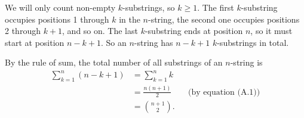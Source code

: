 We will only count non-empty $k$-substrings, so $k\ge1$.
The first $k$-substring occupies positions 1 through $k$ in the $n$-string, the second one occupies positions 2 through $k+1$, and so on.
The last $k$-substring ends at position $n$, so it must start at position $n-k+1$.
So an $n$-string has $n-k+1$ $k$-substrings in total.

By the rule of sum, the total number of all substrings of an $n$-string is
\begin{align*}
    \sum_{k=1}^n(n-k+1) &= \sum_{k=1}^nk \\[1mm]
    &= \frac{n(n+1)}{2} && \text{(by equation (A.1))} \\
    &= \binom{n+1}{2}.
\end{align*}
